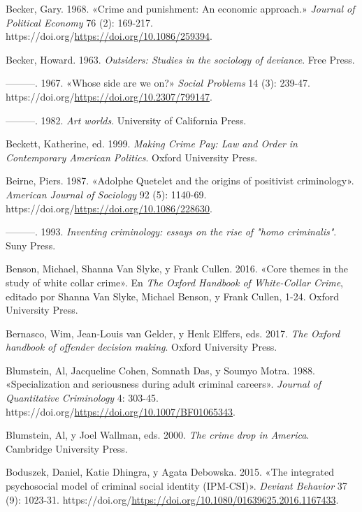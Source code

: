 \documentclass[
  spanish,
  letterpaper,
  DIV=11,
  numbers=noendperiod]{scrreprt}
\newlength{\cslhangindent}
\newenvironment{CSLReferences}[2] %
 {\begin{list}{}{%
  \setlength{\itemindent}{0pt}
  \setlength{\leftmargin}{0pt}
  \setlength{\parsep}{0pt}
  \ifodd #1
   \setlength{\leftmargin}{\cslhangindent}
   \setlength{\itemindent}{-1\cslhangindent}
  \fi
  \setlength{\itemsep}{#2\baselineskip}}}
 {\end{list}}
\begin{document}
\begin{CSLReferences}{1}{0}
Becker, Gary. 1968. {«Crime and punishment: An economic approach.»}
\emph{Journal of Political Economy} 76 (2): 169-217.
https://doi.org/\url{https://doi.org/10.1086/259394}.

Becker, Howard. 1963. \emph{Outsiders: Studies in the sociology of
deviance}. Free Press.

---------. 1967. {«Whose side are we on?»} \emph{Social Problems} 14
(3): 239-47. https://doi.org/\url{https://doi.org/10.2307/799147}.

---------. 1982. \emph{Art worlds}. University of California Press.

Beckett, Katherine, ed. 1999. \emph{Making Crime Pay: Law and Order in
Contemporary American Politics}. Oxford University Press.

Beirne, Piers. 1987. {«Adolphe Quetelet and the origins of positivist
criminology»}. \emph{American Journal of Sociology} 92 (5): 1140-69.
https://doi.org/\url{https://doi.org/10.1086/228630}.

---------. 1993. \emph{Inventing criminology: essays on the rise of
"homo criminalis"}. Suny Press.

Benson, Michael, Shanna Van Slyke, y Frank Cullen. 2016. {«Core themes
in the study of white collar crime»}. En \emph{The Oxford Handbook of
White-Collar Crime}, editado por Shanna Van Slyke, Michael Benson, y
Frank Cullen, 1-24. Oxford University Press.

Bernasco, Wim, Jean-Louis van Gelder, y Henk Elffers, eds. 2017.
\emph{The Oxford handbook of offender decision making}. Oxford
University Press.

Blumstein, Al, Jacqueline Cohen, Somnath Das, y Soumyo Motra. 1988.
{«Specialization and seriousness during adult criminal careers»}.
\emph{Journal of Quantitative Criminology} 4: 303-45.
https://doi.org/\url{https://doi.org/10.1007/BF01065343}.

Blumstein, Al, y Joel Wallman, eds. 2000. \emph{The crime drop in
America}. Cambridge University Press.

Boduszek, Daniel, Katie Dhingra, y Agata Debowska. 2015. {«The
integrated psychosocial model of criminal social identity (IPM-CSI)»}.
\emph{Deviant Behavior} 37 (9): 1023-31.
https://doi.org/\url{https://doi.org/10.1080/01639625.2016.1167433}.


\end{CSLReferences}
\end{document}
